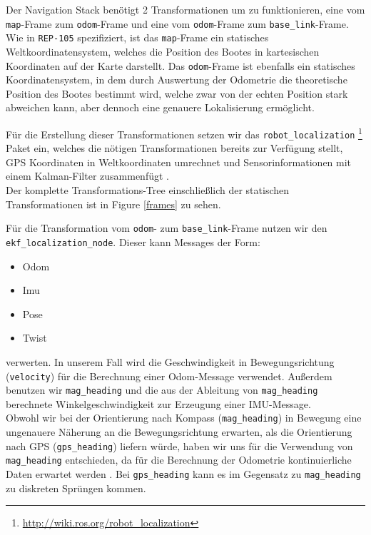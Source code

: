 \documentclass[11pt]{article}
\begin{document}
Der Navigation Stack benötigt 2 Transformationen um zu funktionieren, eine vom \texttt{map}-Frame zum \texttt{odom}-Frame und eine vom \texttt{odom}-Frame zum \texttt{base\_link}-Frame. Wie in \texttt{REP-105} \cite{REP105} spezifiziert, ist das \texttt{map}-Frame ein statisches Weltkoordinatensystem, welches die Position des Bootes in kartesischen Koordinaten auf der Karte darstellt.  Das \texttt{odom}-Frame ist ebenfalls ein statisches Koordinatensystem, in dem durch Auswertung der Odometrie die theoretische Position des Bootes bestimmt wird, welche zwar von der echten Position stark abweichen kann, aber dennoch eine genauere Lokalisierung ermöglicht.

Für die Erstellung dieser Transformationen setzen wir das \texttt{robot\_localization} \footnote{\url{http://wiki.ros.org/robot_localization}} Paket ein, welches die nötigen Transformationen bereits zur Verfügung stellt, GPS Koordinaten in Weltkoordinaten umrechnet und Sensorinformationen mit einem Kalman-Filter zusammenfügt \cite{MooreStouchKeneralizedEkf2014}.\\
Der komplette Transformations-Tree einschließlich der statischen Transformationen ist in Figure \ref{frames} zu sehen.

Für die Transformation vom \texttt{odom}- zum \texttt{base\_link}-Frame nutzen wir den \texttt{ekf\_localization\_node}. Dieser kann Messages der Form:
\begin{itemize}
	\item Odom
	\item Imu
	\item Pose
	\item Twist
\end{itemize}
verwerten.
In unserem Fall wird die Geschwindigkeit in Bewegungsrichtung (\texttt{velocity}) für die Berechnung einer Odom-Message verwendet.
Außerdem benutzen wir \texttt{mag\_heading} und die aus der Ableitung von \texttt{mag\_heading} berechnete Winkelgeschwindigkeit zur Erzeugung einer IMU-Message.\\
Obwohl wir bei der Orientierung nach Kompass (\texttt{mag\_heading}) in Bewegung eine ungenauere Näherung an die Bewegungsrichtung erwarten, als die Orientierung nach GPS (\texttt{gps\_heading}) liefern würde, haben wir uns für die Verwendung von \texttt{mag\_heading} entschieden, da für die Berechnung der Odometrie kontinuierliche Daten erwartet werden \cite{REP105}. Bei \texttt{gps\_heading} kann es im Gegensatz zu \texttt{mag\_heading} zu diskreten Sprüngen kommen.\\
\end{document}
